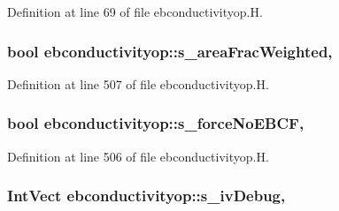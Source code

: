 Definition at line 69 of file ebconductivityop.\+H.

\subsubsection[{\texorpdfstring{s\+\_\+area\+Frac\+Weighted}{s_areaFracWeighted}}]{\setlength{\rightskip}{0pt plus 5cm}bool ebconductivityop\+::s\+\_\+area\+Frac\+Weighted\hspace{0.3cm}{\ttfamily [static]}, {\ttfamily [protected]}}\hypertarget{classebconductivityop_a9bba46a62c1aafeb6ae8f8cb46e17cc5}{}\label{classebconductivityop_a9bba46a62c1aafeb6ae8f8cb46e17cc5}


Definition at line 507 of file ebconductivityop.\+H.

\subsubsection[{\texorpdfstring{s\+\_\+force\+No\+E\+B\+CF}{s_forceNoEBCF}}]{\setlength{\rightskip}{0pt plus 5cm}bool ebconductivityop\+::s\+\_\+force\+No\+E\+B\+CF\hspace{0.3cm}{\ttfamily [static]}, {\ttfamily [protected]}}\hypertarget{classebconductivityop_a0e737f803b795c6fa277106985376afe}{}\label{classebconductivityop_a0e737f803b795c6fa277106985376afe}


Definition at line 506 of file ebconductivityop.\+H.

\subsubsection[{\texorpdfstring{s\+\_\+iv\+Debug}{s_ivDebug}}]{\setlength{\rightskip}{0pt plus 5cm}Int\+Vect ebconductivityop\+::s\+\_\+iv\+Debug\hspace{0.3cm}{\ttfamily [static]}, {\ttfamily [protected]}}\hypertarget{classebconductivityop_adcdfdebdbe5231de31394ccd7db44176}{}\label{classebconductivityop_adcdfdebdbe5231de31394ccd7db44176}


